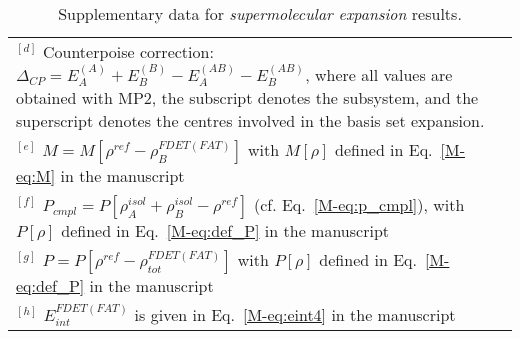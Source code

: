 \documentclass[amsmath,amssymb,preprint,aip,jcp]{revtex4-1}
\begin{document}
\begin{table}[H]
\begin{center}
{\begin{tabular}{|l|l|l|l|l|l|l|l|l|l|}
\multicolumn{10}{p{1.0\textwidth}}{$^{[d]}$ Counterpoise correction: $\Delta_{CP} = E_{A}^{(A)} + E_{B}^{(B)} - E_{A}^{(AB)} - E_{B}^{(AB)}$, where all values are obtained with MP2, the subscript denotes the subsystem, and the superscript denotes the centres involved in the basis set expansion.} \\
\multicolumn{10}{p{1.0\textwidth}}{$^{[e]}$ $M=M[\rho^{ref} - \rho^{FDET(FAT)}_{B}]$ with $M[\rho]$ defined in Eq.~\ref{M-eq:M} in the manuscript}\\
\multicolumn{10}{p{1.0\textwidth}}{$^{[f]}$ $P_{cmpl}=P[\rho_A^{isol}+\rho_B^{isol} - \rho^{ref}]$ (cf. Eq.~\ref{M-eq:p_cmpl}), with $P[\rho]$ defined in Eq.~\ref{M-eq:def_P} in the manuscript}\\
\multicolumn{10}{p{1.0\textwidth}}{$^{[g]}$ $P=P[\rho^{ref} - \rho_{tot}^{FDET(FAT)}]$ with $P[\rho]$ defined in Eq.~\ref{M-eq:def_P} in the manuscript}\\
\multicolumn{10}{p{1.0\textwidth}}{$^{[h]}$ $E^{FDET(FAT)}_{int}$ is given in Eq.~\ref{M-eq:eint4} in the manuscript}\\
\end{tabular}
}
\end{center}
\caption{Supplementary data for \textit{supermolecular expansion} results.}
\end{table}
\end{document}
